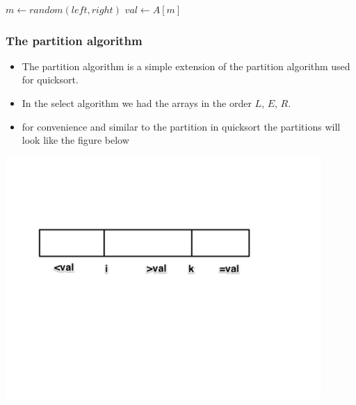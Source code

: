 \documentclass{beamer}
\begin{document}
\begin{frame}
    \begin{function}[H]
 
  \DontPrintSemicolon
  \BlankLine
  $m\gets random(left,right)$\;
  $val\gets A[m]$\;
  \;
 
\end{function}
\end{frame}


\begin{frame}
  \frametitle{The partition algorithm}
  \begin{itemize}
  \item The partition algorithm is a simple extension of the partition algorithm used for quicksort.
  \item In the select algorithm we had the arrays in the order $L$, $E$, $R$.
\item for convenience and similar to the partition in quicksort the partitions will look like the figure below
  \end{itemize}
\includegraphics[width=0.9\textwidth]{divide-figs/partition}

\end{frame}
\end{document}
